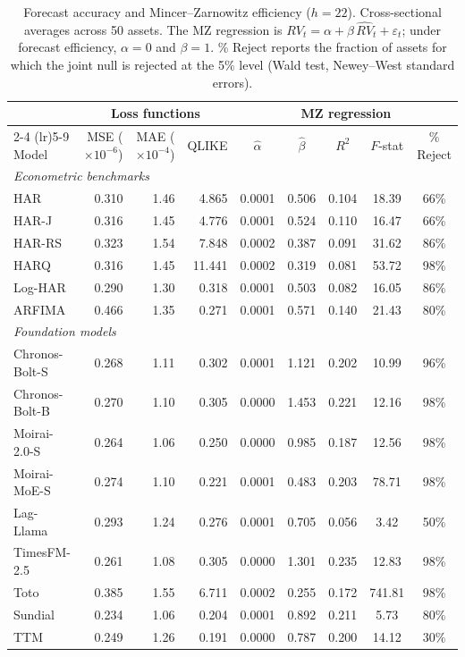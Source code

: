 \begin{table}[H]
\centering
\singlespacing
\caption{Forecast accuracy and Mincer--Zarnowitz efficiency ($h = 22$). Cross-sectional averages across 50 assets. The MZ regression is $RV_t = \alpha + \beta \, \widehat{RV}_t + \varepsilon_t$; under forecast efficiency, $\alpha = 0$ and $\beta = 1$. \% Reject reports the fraction of assets for which the joint null is rejected at the 5\% level (Wald test, Newey--West standard errors).}
\label{tab:mz_h22}
\footnotesize\setlength{\tabcolsep}{4pt}\renewcommand{\arraystretch}{0.85}
\begin{tabular}{lrrr ccccc}
\toprule
 & \multicolumn{3}{c}{Loss functions} & \multicolumn{5}{c}{MZ regression} \\
\cmidrule(lr){2-4} \cmidrule(lr){5-9}
Model & MSE ($\times 10^{-6}$) & MAE ($\times 10^{-4}$) & QLIKE & $\hat{\alpha}$ & $\hat{\beta}$ & $R^2$ & $F$-stat & \% Reject \\
\midrule
\multicolumn{9}{l}{\textit{Econometric benchmarks}} \\
HAR          & 0.310 & 1.46 & 4.865 &    0.0001 & 0.506 & 0.104 & 18.39 & 66\% \\
HAR-J        & 0.316 & 1.45 & 4.776 &    0.0001 & 0.524 & 0.110 & 16.47 & 66\% \\
HAR-RS       & 0.323 & 1.54 & 7.848 &    0.0002 & 0.387 & 0.091 & 31.62 & 86\% \\
HARQ         & 0.316 & 1.45 & 11.441 &    0.0002 & 0.319 & 0.081 & 53.72 & 98\% \\
Log-HAR      & 0.290 & 1.30 & 0.318 &    0.0001 & 0.503 & 0.082 & 16.05 & 86\% \\
ARFIMA       & 0.466 & 1.35 & 0.271 &    0.0001 & 0.571 & 0.140 & 21.43 & 80\% \\
\midrule
\multicolumn{9}{l}{\textit{Foundation models}} \\
Chronos-Bolt-S & 0.268 & 1.11 & 0.302 &  0.0001 & 1.121 & 0.202 & 10.99 & 96\% \\
Chronos-Bolt-B & 0.270 & 1.10 & 0.305 &  0.0000 & 1.453 & 0.221 & 12.16 & 98\% \\
Moirai-2.0-S   & 0.264 & 1.06 & 0.250 &  0.0000 & 0.985 & 0.187 & 12.56 & 98\% \\
Moirai-MoE-S   & 0.274 & 1.10 & 0.221 &  0.0001 & 0.483 & 0.203 & 78.71 & 98\% \\
Lag-Llama    & 0.293 & 1.24 & 0.276 &    0.0001 & 0.705 & 0.056 &  3.42 & 50\% \\
TimesFM-2.5    & 0.261 & 1.08 & 0.305 &  0.0000 & 1.301 & 0.235 & 12.83 & 98\% \\
Toto           & 0.385 & 1.55 & 6.711 &  0.0002 & 0.255 & 0.172 & 741.81 & 98\% \\
Sundial        & 0.234 & 1.06 & 0.204 &  0.0001 & 0.892 & 0.211 &  5.73 & 80\% \\
TTM            & 0.249 & 1.26 & 0.191 &    0.0000 & 0.787 & 0.200 & 14.12 & 30\% \\
\bottomrule
\end{tabular}
\end{table}
